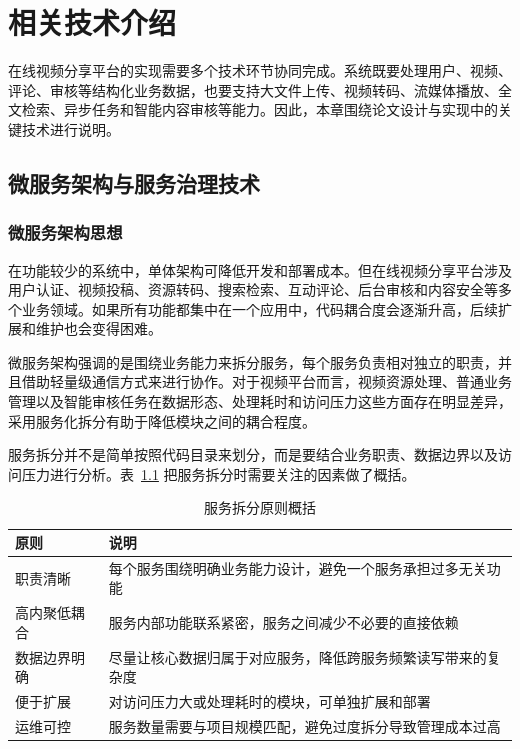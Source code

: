 
\chapter{相关技术介绍}
\label{chap:related-technologies}

在线视频分享平台的实现需要多个技术环节协同完成。系统既要处理用户、视频、评论、审核等结构化业务数据，也要支持大文件上传、视频转码、流媒体播放、全文检索、异步任务和智能内容审核等能力。因此，本章围绕论文设计与实现中的关键技术进行说明。

\section{微服务架构与服务治理技术}
\label{sec:microservice-governance}

\subsection{微服务架构思想}
\label{subsec:microservice-architecture}

在功能较少的系统中，单体架构可降低开发和部署成本。但在线视频分享平台涉及用户认证、视频投稿、资源转码、搜索检索、互动评论、后台审核和内容安全等多个业务领域。如果所有功能都集中在一个应用中，代码耦合度会逐渐升高，后续扩展和维护也会变得困难。

微服务架构强调的是围绕业务能力来拆分服务，每个服务负责相对独立的职责，并且借助轻量级通信方式来进行协作\cite{lewis2014microservices}。对于视频平台而言，视频资源处理、普通业务管理以及智能审核任务在数据形态、处理耗时和访问压力这些方面存在明显差异，采用服务化拆分有助于降低模块之间的耦合程度。

服务拆分并不是简单按照代码目录来划分，而是要结合业务职责、数据边界以及访问压力进行分析。表~\ref{tab:service-split-principles} 把服务拆分时需要关注的因素做了概括。

\begin{table}[htbp]
  \centering
  \caption{服务拆分原则概括}
  \label{tab:service-split-principles}
  \begin{tabular}{p{}p{}}
    \hline
    \textbf{原则} & \textbf{说明} \\
    \hline
    职责清晰 & 每个服务围绕明确业务能力设计，避免一个服务承担过多无关功能 \\
    高内聚低耦合 & 服务内部功能联系紧密，服务之间减少不必要的直接依赖 \\
    数据边界明确 & 尽量让核心数据归属于对应服务，降低跨服务频繁读写带来的复杂度 \\
    便于扩展 & 对访问压力大或处理耗时的模块，可单独扩展和部署 \\
    运维可控 & 服务数量需要与项目规模匹配，避免过度拆分导致管理成本过高 \\
    \hline
  \end{tabular}
\end{table}

